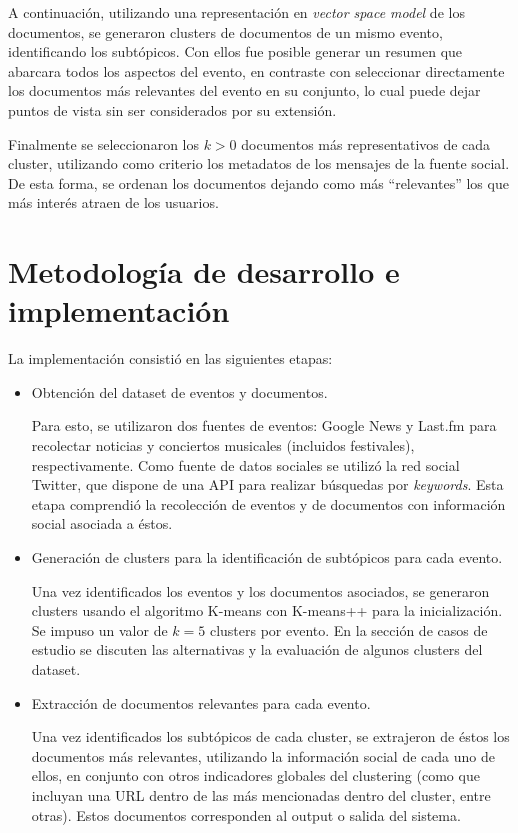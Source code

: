    A continuación, utilizando una representación 
   en \emph{vector space model} de los documentos, se generaron clusters
   de documentos de un mismo evento, identificando los subtópicos. Con
   ellos fue posible generar un resumen que abarcara todos los
   aspectos del evento, en contraste con seleccionar directamente los
   documentos más relevantes del evento en su conjunto, lo cual puede
   dejar puntos de vista sin ser considerados por su extensión.

   Finalmente se seleccionaron los $k>0$ documentos más representativos de
   cada cluster, utilizando como criterio los metadatos de los
   mensajes de la fuente social. De esta forma, se ordenan los
   documentos dejando como más ``relevantes'' los que más interés atraen
   de los usuarios.

\section{Metodología de desarrollo e implementación}
\label{sec-4.2}

\label{impl}

   La implementación consistió en las siguientes etapas:

\begin{itemize}
\item Obtención del dataset de eventos y documentos.

     Para esto, se utilizaron dos fuentes de eventos: Google News y
     Last.fm para recolectar noticias y conciertos musicales
     (incluidos festivales), respectivamente. Como fuente de datos
     sociales se utilizó la red social Twitter, que dispone de una API
     para realizar búsquedas por \emph{keywords}. Esta etapa comprendió
     la recolección de eventos y de documentos con información social
     asociada a éstos.
\item Generación de clusters para la identificación de subtópicos para
     cada evento.

     Una vez identificados los eventos y los documentos asociados, se
     generaron clusters usando el algoritmo K-means con K-means++ para
     la inicialización. Se impuso un valor de $k=5$ clusters por
     evento. En la sección de casos de estudio se discuten las
     alternativas y la evaluación de algunos clusters del dataset.
\item Extracción de documentos relevantes para cada evento.

     Una vez identificados los subtópicos de cada cluster, se
     extrajeron de éstos los documentos más relevantes, utilizando la
     información social de cada uno de ellos, en conjunto con otros
     indicadores globales del clustering (como que incluyan una URL
     dentro de las más mencionadas dentro del cluster, entre
     otras). Estos documentos corresponden al output o salida del
     sistema.
\end{itemize}
